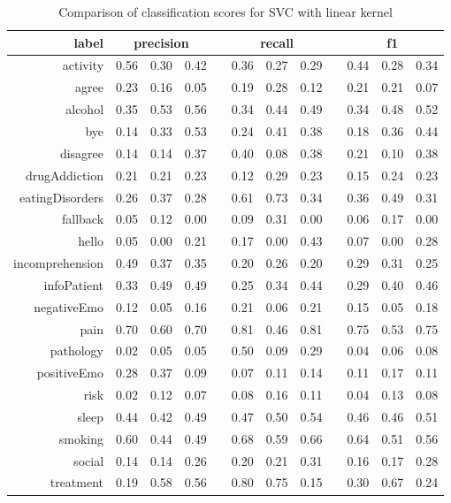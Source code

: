 \documentclass[11pt]{article}
\begin{document}
\begin{table}[htb]
\begin{center}
\begin{tabular}{ |r|c|c|c|l|c|c|c|l|c|c|c| }
\hline
label 			& \multicolumn{3}{c|}{precision} && \multicolumn{3}{c|}{recall} && \multicolumn{3}{c|}{f1} \\ \hline 
activity 		&  0.56 & 0.30 & 0.42 && 0.36 & 0.27 & 0.29 && 0.44 & 0.28 & 0.34 \\ \hline 
agree 			&  0.23 & 0.16 & 0.05 && 0.19 & 0.28 & 0.12 && 0.21 & 0.21 & 0.07 \\ \hline 
alcohol 		&  0.35 & 0.53 & 0.56 && 0.34 & 0.44 & 0.49 && 0.34 & 0.48 & 0.52 \\ \hline 
bye 			&  0.14 & 0.33 & 0.53 && 0.24 & 0.41 & 0.38 && 0.18 & 0.36 & 0.44 \\ \hline 
disagree 		&  0.14 & 0.14 & 0.37 && 0.40 & 0.08 & 0.38 && 0.21 & 0.10 & 0.38 \\ \hline 
drugAddiction 	&  0.21 & 0.21 & 0.23 && 0.12 & 0.29 & 0.23 && 0.15 & 0.24 & 0.23 \\ \hline 
eatingDisorders &  0.26 & 0.37 & 0.28 && 0.61 & 0.73 & 0.34 && 0.36 & 0.49 & 0.31 \\ \hline 
fallback 		&  0.05 & 0.12 & 0.00 && 0.09 & 0.31 & 0.00 && 0.06 & 0.17 & 0.00 \\ \hline 
hello 			&  0.05 & 0.00 & 0.21 && 0.17 & 0.00 & 0.43 && 0.07 & 0.00 & 0.28 \\ \hline 
incomprehension &  0.49 & 0.37 & 0.35 && 0.20 & 0.26 & 0.20 && 0.29 & 0.31 & 0.25 \\ \hline 
infoPatient 	&  0.33 & 0.49 & 0.49 && 0.25 & 0.34 & 0.44 && 0.29 & 0.40 & 0.46 \\ \hline 
negativeEmo 	&  0.12 & 0.05 & 0.16 && 0.21 & 0.06 & 0.21 && 0.15 & 0.05 & 0.18 \\ \hline 
pain 			&  0.70 & 0.60 & 0.70 && 0.81 & 0.46 & 0.81 && 0.75 & 0.53 & 0.75 \\ \hline 
pathology 		&  0.02 & 0.05 & 0.05 && 0.50 & 0.09 & 0.29 && 0.04 & 0.06 & 0.08 \\ \hline 
positiveEmo 	&  0.28 & 0.37 & 0.09 && 0.07 & 0.11 & 0.14 && 0.11 & 0.17 & 0.11 \\ \hline 
risk 			&  0.02 & 0.12 & 0.07 && 0.08 & 0.16 & 0.11 && 0.04 & 0.13 & 0.08 \\ \hline 
sleep 			&  0.44 & 0.42 & 0.49 && 0.47 & 0.50 & 0.54 && 0.46 & 0.46 & 0.51 \\ \hline 
smoking 		&  0.60 & 0.44 & 0.49 && 0.68 & 0.59 & 0.66 && 0.64 & 0.51 & 0.56 \\ \hline 
social 			&  0.14 & 0.14 & 0.26 && 0.20 & 0.21 & 0.31 && 0.16 & 0.17 & 0.28 \\ \hline 
treatment		&  0.19 & 0.58 & 0.56 && 0.80 & 0.75 & 0.15 && 0.30 & 0.67 & 0.24 \\ \hline 
\end{tabular}
\caption{Comparison of classification scores for SVC with linear kernel}
\label{tab:results-svc-linear}
\end{center}
\end{table}
\FloatBarrier
\end{document}
